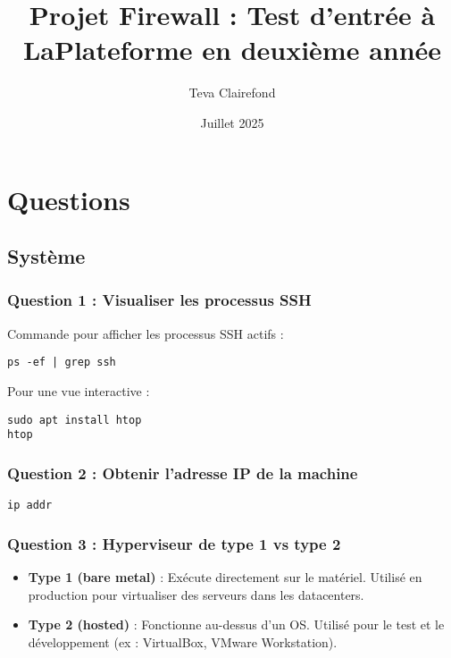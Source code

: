 \documentclass[12pt,a4paper]{article}
\title{\textbf{Projet Firewall : Test d'entrée à LaPlateforme en deuxième année}}
\author{Teva Clairefond}
\date{Juillet 2025}
\begin{document}
\maketitle
\tableofcontents
\newpage






\section{Questions}

\subsection{Système}

\subsubsection{Question 1 : Visualiser les processus SSH}

Commande pour afficher les processus SSH actifs :
\begin{lstlisting}
ps -ef | grep ssh
\end{lstlisting}

Pour une vue interactive :
\begin{lstlisting}
sudo apt install htop
htop
\end{lstlisting}

\subsubsection{Question 2 : Obtenir l'adresse IP de la machine}

\begin{lstlisting}
ip addr
\end{lstlisting}

\subsubsection{Question 3 : Hyperviseur de type 1 vs type 2}

\begin{itemize}
    \item \textbf{Type 1 (bare metal)} : Exécute directement sur le matériel. Utilisé en production pour virtualiser des serveurs dans les datacenters.
    \item \textbf{Type 2 (hosted)} : Fonctionne au-dessus d’un OS. Utilisé pour le test et le développement (ex : VirtualBox, VMware Workstation).
\end{itemize}
\end{document}
